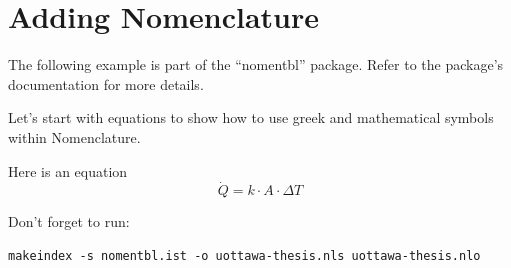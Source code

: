 \section{Adding Nomenclature}

The following example is part of the ``nomentbl'' package. Refer to the package's documentation for more details.

\bigskip

\noindent
Let's start with equations to show how to use greek and mathematical symbols within Nomenclature.

Here is an equation
%
\begin{equation}\label{eq:heatflux}
  \dot{Q} = k \cdot A \cdot \Delta T
\end{equation}%
%

%






\bigskip

\noindent
Don't forget to run:
\begin{verbatim}
makeindex -s nomentbl.ist -o uottawa-thesis.nls uottawa-thesis.nlo
\end{verbatim}



